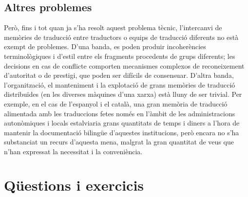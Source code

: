 \subsection{Altres problemes}
Però, fins i tot quan ja s'ha resolt aquest problema tècnic,
l'intercanvi de memòries de traducció entre traductors o equips de
traducció diferents no està exempt de problemes. D'una banda, es poden
produir incoherències terminològiques i d'estil entre els fragments
procedents de grups diferents; les decisions en cas de conflicte
comporten mecanismes complexos de reconeixement d'autoritat o de
prestigi, que poden ser difícils de consensuar. D'altra banda,
l'organització, el manteniment i la explotació de grans memòries de
traducció distribuïdes (en les diverses màquines d'una xarxa) està
lluny de ser trivial. Per exemple, en el cas de l'espanyol i el
català, una gran memòria de traducció alimentada amb les traduccions
fetes només en l'àmbit de les administracions autonòmiques i locals
estalviaria grans quantitats de temps i diners a l'hora de mantenir la
documentació bilingüe d'aquestes institucions, però encara no s'ha
substanciat un recurs d'aquesta mena, malgrat la gran quantitat de
veus que n'han expressat la necessitat i la conveniència.

\section{Qüestions i exercicis}

